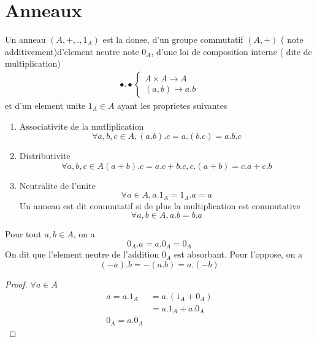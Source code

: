 \documentclass[../main.tex]{subfiles}
\begin{document}
\section{Anneaux}
\begin{defn}[Anneaux]\label{defn:anneaux}
	Un anneau $(A,+,.,1_A)$  est la donee, d'un groupe commutatif $(A,+)$ ( note additivement)d'element neutre note $0_A$, d'une loi de composition interne ( dite de multiplication) 
	\begin{align*}
	\bullet.\bullet
	\begin{cases}
	A\times A \to A\\
	( a,b) \to a.b
	\end{cases}
	\end{align*}	
	et d'un element unite $1_A \in A$ ayant les proprietes suivantes
	\begin{enumerate}
	\item Associativite de la mutliplication
		\[ 
			\forall a,b,c \in A, ( a.b).c = a.(b.c) = a.b.c
		\]
		
	\item Distributivite
		\[ 
			\forall a,b,c \in A ( a+b).c = a.c + b.c, c.(a+b) = c.a + c.b
		\]
		
	\item Neutralite de l'unite
		\[ 
		\forall a \in A, a. 1_A = 1_A.a = a
		\]
		Un anneau est dit commutatif si de plus la multiplication est commutative
		\[ 
		\forall a,b \in A , a.b = b.a
		\]
		
	\end{enumerate}
\end{defn}
\begin{lemma}
Pour tout $a,b \in A$, on a
\[ 
0_A.a = a.0_A = 0_A
\]
On dit que l'element neutre de l'addition $0_A$ est absorbant. Pour l'oppose, on a
\[ 
	( -a).b = - ( a.b) = a.(-b)
\]

\end{lemma}
\begin{proof}
$\forall a \in A$\\
 \begin{align*}
	 a = a.1_A &= a.(1_A + 0_A)\\
		   &= a. 1_A + a.0_A\\
		 0_A = a.0_A
 \end{align*}

\end{proof}
\end{document}
